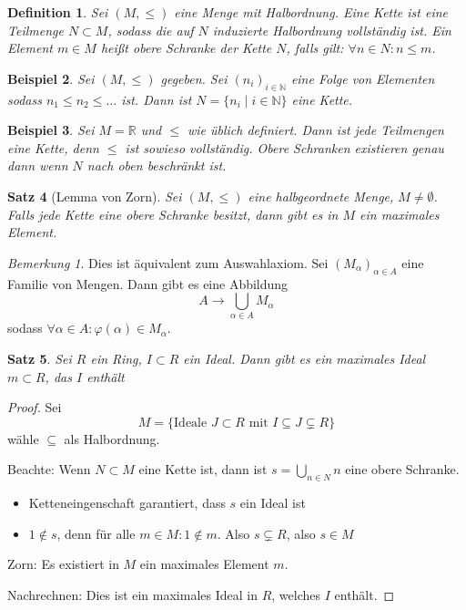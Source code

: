\documentclass[a4paper,12pt,numbers=noenddot,parskip=full]{scrartcl}
\newcommand{\setN}{\mathbb{N}}
\newcommand{\setR}{\mathbb{R}}
\theoremstyle{dotless}
\newtheorem{theorem}{Satz}[section]
\newtheorem{definition}[theorem]{Definition}
\newtheorem{example}[theorem]{Beispiel}
\theoremstyle{remark}
\newtheorem*{remark}{Bemerkung}
\begin{document}
	\begin{definition}
		Sei $(M, \leq)$ eine Menge mit Halbordnung. Eine Kette ist eine Teilmenge $N \subset M$, sodass die auf $N$ induzierte Halbordnung vollständig ist. Ein Element $m \in M$ heißt obere Schranke der Kette $N$, falls gilt: $\forall n \in N: n \leq m$.
	\end{definition}

	\begin{example}
		Sei $(M, \leq)$ gegeben. Sei $(n_i)_{i \in \setN}$ eine Folge von Elementen sodass $n_1 \leq n_2 \leq \dots$ ist. Dann ist $N = \{ n_i \mid i \in \setN \}$ eine Kette.
	\end{example}

	\begin{example}
		Sei $M = \setR$ und $\leq$ wie üblich definiert. Dann ist jede Teilmengen eine Kette, denn $\leq$ ist sowieso vollständig. Obere Schranken existieren genau dann wenn $N$ nach oben beschränkt ist.
	\end{example}

	\begin{theorem}[Lemma von Zorn]
		Sei $(M, \leq)$ eine halbgeordnete Menge, $M \neq \emptyset$. Falls jede Kette eine obere Schranke besitzt, dann gibt es in $M$ ein maximales Element.
	\end{theorem}

	\begin{remark}
		Dies ist äquivalent zum Auswahlaxiom. Sei $(M_\alpha)_{\alpha \in A}$ eine Familie von Mengen. Dann gibt es eine Abbildung
		\begin{equation*}
			A \to \bigcup_{\alpha \in A} M_\alpha
		\end{equation*}
		sodass $\forall \alpha \in A: \varphi(\alpha) \in M_\alpha$.
	\end{remark}

	\begin{theorem}
		Sei $R$ ein Ring, $I \subset R$ ein Ideal. Dann gibt es ein maximales Ideal $m \subset R$, das $I$ enthält
	\end{theorem}
	
	\begin{proof}
		Sei
		\begin{equation*}
			M = \{ \text{Ideale $J \subset R$ mit $I \subseteq J \subsetneq R$} \}
		\end{equation*}
		wähle $\subseteq$ als Halbordnung.
		
		Beachte: Wenn $N \subset M$ eine Kette ist, dann ist $s = \bigcup_{n \in N} n$ eine obere Schranke.
		\begin{itemize}
			\item Ketteneingenschaft garantiert, dass $s$ ein Ideal ist
			\item $1 \notin s$, denn für alle $m \in M: 1 \notin m$. Also $s \subsetneq R$, also $s \in M$
		\end{itemize}
		Zorn: Es existiert in $M$ ein maximales Element $m$.
		
		Nachrechnen: Dies ist ein maximales Ideal in $R$, welches $I$ enthält.
	\end{proof}
	
\end{document}

